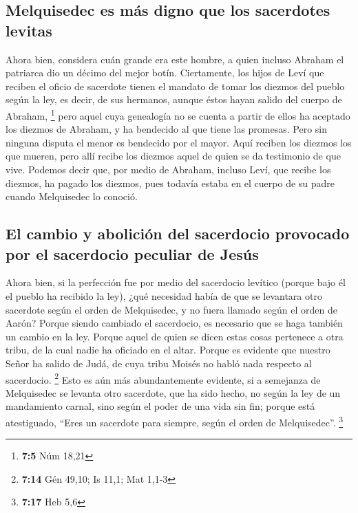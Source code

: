 \begin{paracol}{2}
\hypertarget{melquisedec-es-muxe1s-digno-que-los-sacerdotes-levitas}{%
\subsection{Melquisedec es más digno que los sacerdotes
levitas}\label{melquisedec-es-muxe1s-digno-que-los-sacerdotes-levitas}}

 Ahora bien, considera cuán grande era este hombre, a
quien incluso Abraham el patriarca dio un décimo del mejor botín.
 Ciertamente, los hijos de Leví que reciben el oficio de
sacerdote tienen el mandato de tomar los diezmos del pueblo según la
ley, es decir, de sus hermanos, aunque éstos hayan salido del cuerpo de
Abraham, \footnote{\textbf{7:5} Núm 18,21}  pero aquel
cuya genealogía no se cuenta a partir de ellos ha aceptado los diezmos
de Abraham, y ha bendecido al que tiene las promesas. 
Pero sin ninguna disputa el menor es bendecido por el mayor.
 Aquí reciben los diezmos los que mueren, pero allí recibe
los diezmos aquel de quien se da testimonio de que vive. 
Podemos decir que, por medio de Abraham, incluso Leví, que recibe los
diezmos, ha pagado los diezmos,  pues todavía estaba en
el cuerpo de su padre cuando Melquisedec lo conoció.

\hypertarget{el-cambio-y-aboliciuxf3n-del-sacerdocio-provocado-por-el-sacerdocio-peculiar-de-jesuxfas}{%
\subsection{El cambio y abolición del sacerdocio provocado por el
sacerdocio peculiar de
Jesús}\label{el-cambio-y-aboliciuxf3n-del-sacerdocio-provocado-por-el-sacerdocio-peculiar-de-jesuxfas}}

 Ahora bien, si la perfección fue por medio del
sacerdocio levítico (porque bajo él el pueblo ha recibido la ley), ¿qué
necesidad había de que se levantara otro sacerdote según el orden de
Melquisedec, y no fuera llamado según el orden de Aarón? 
Porque siendo cambiado el sacerdocio, es necesario que se haga también
un cambio en la ley.  Porque aquel de quien se dicen
estas cosas pertenece a otra tribu, de la cual nadie ha oficiado en el
altar.  Porque es evidente que nuestro Señor ha salido de
Judá, de cuya tribu Moisés no habló nada respecto al sacerdocio.
\footnote{\textbf{7:14} Gén 49,10; Is 11,1; Mat 1,1-3} 
Esto es aún más abundantemente evidente, si a semejanza de Melquisedec
se levanta otro sacerdote,  que ha sido hecho, no según
la ley de un mandamiento carnal, sino según el poder de una vida sin
fin;  porque está atestiguado, ``Eres un sacerdote para
siempre, según el orden de Melquisedec''. \footnote{\textbf{7:17} Heb
  5,6}


\end{paracol}
